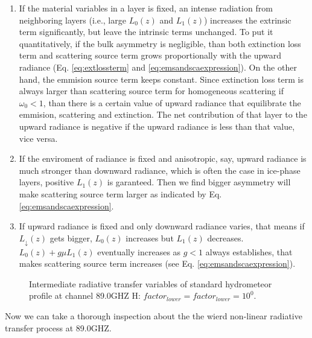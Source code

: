 \begin{enumerate}
    \item {} If the material variables in a layer is fixed, an intense radiation from neighboring layers (i.e., large $L_{0}(z)$ and $L_{1}(z)$)
increases the extrinsic term significantly, but leave the intrinsic terms unchanged. To put it quantitatively, if the bulk asymmetry is negligible,
than both extinction loss term and scattering source term grows proportionally with the upward radiance (Eq. \ref{eq:extlossterm} and \ref{eq:emsandscaexpression}).
On the other hand, the emmision source term keeps constant. Since extinction loss term is always larger than scattering source term for homogeneous scattering if $\omega_{0} < 1$,
than there is a certain value of upward radiance that equilibrate the emmision, scattering and extinction. The net contribution of that layer to the upward radiance
is negative if the upward radiance is less than that value, vice versa.  
    \item {} If the enviroment of radiance is fixed and anisotropic, say, upward radiance is much stronger than downward radiance,
    which is often the case in ice-phase layers, positive $L_{1}(z)$ is garanteed. Then we find bigger asymmetry will make 
    scattering source term larger as indicated by Eq. \ref{eq:emsandscaexpression}.
    \item {} If upward radiance is fixed and only downward radiance varies, that means if $L_{\downarrow}(z)$ gets bigger, $L_{0}(z)$
    increases but $L_{1}(z)$ decreases. $L_{0}(z) + g\mu L_{1}(z)$ eventually increases as $g < 1$ always establishes, that makes scattering
    source term increases (see Eq. \ref{eq:emsandscaexpression}).  
\end{enumerate}

\begin{figure}[hbtp] 
\centering
{}
\caption{Intermediate radiative transfer variables of standard hydrometeor profile at channel 89.0GHZ H: $factor_{lower} = factor_{lower} = 10^{0}$.}
\label{fig:MWRI5zi33}
\end{figure}

Now we can take a thorough inspection about the the wierd non-linear radiative transfer process at 89.0GHZ.

